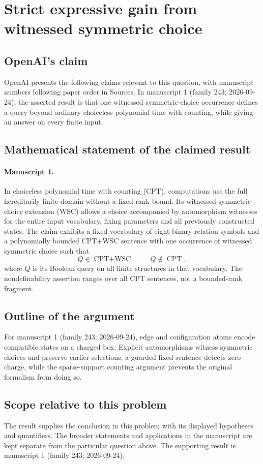 \documentclass[11pt]{article}
\begin{document}
\section*{Strict expressive gain from witnessed symmetric choice}

\subsection{OpenAI's claim}
OpenAI presents the following claims relevant to this question, with manuscript numbers following paper order in Sources. In manuscript 1 (family 243; 2026-09-24), the asserted result is that one witnessed symmetric-choice occurrence defines a query beyond ordinary choiceless polynomial time with counting, while giving an answer on every finite input.

\subsection{Mathematical statement of the claimed result}
\paragraph{Manuscript 1.}
In choiceless polynomial time with counting (CPT), computations use the full hereditarily finite domain without a fixed rank bound. Its witnessed symmetric choice extension (WSC) allows a choice accompanied by automorphism witnesses for the entire input vocabulary, fixing parameters and all previously constructed states. The claim exhibits a fixed vocabulary of eight binary relation symbols and a polynomially bounded CPT+WSC sentence with one occurrence of witnessed symmetric choice such that
\[
 Q\in\operatorname{CPT+WSC},\qquad Q\notin\operatorname{CPT},
\]
where $Q$ is its Boolean query on all finite structures in that vocabulary. The nondefinability assertion ranges over all CPT sentences, not a bounded-rank fragment.

\subsection{Outline of the argument}
For manuscript 1 (family 243; 2026-09-24), edge and configuration atoms encode compatible states on a charged box. Explicit automorphisms witness symmetric choices and preserve earlier selections; a guarded fixed sentence detects zero charge, while the sparse-support counting argument prevents the original formalism from doing so.

\subsection{Scope relative to this problem}
The result supplies the conclusion in this problem with its displayed hypotheses and quantifiers. The broader statements and applications in the manuscript are kept separate from the particular question above. The supporting result is manuscript 1 (family 243; 2026-09-24).
\end{document}
